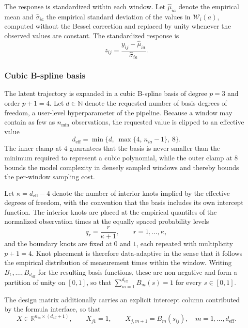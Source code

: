 The response is standardized within each window. Let $\hat{\mu}_{ia}$ denote the empirical mean and $\hat{\sigma}_{ia}$ the empirical standard deviation of the values in $\mathcal{W}_i(a)$, computed without the Bessel correction and replaced by unity whenever the observed values are constant. The standardized response is
$$z_{ij}=\frac{y_{ij}-\hat{\mu}_{ia}}{\hat{\sigma}_{ia}}.$$

\subsubsection{Cubic B-spline basis}
\label{sec:methods:basis}

The latent trajectory is expanded in a cubic B-spline basis of degree $p=3$ and order $p+1=4$. Let $d\in\mathbb{N}$ denote the requested number of basis degrees of freedom, a user-level hyperparameter of the pipeline. Because a window may contain as few as $n_{\min}$ observations, the requested value is clipped to an effective value
$$d_{\mathrm{eff}}=\min\bigl\{d,\ \max\{4,\,n_{ia}-1\},\ 8\bigr\}.$$
The inner clamp at $4$ guarantees that the basis is never smaller than the minimum required to represent a cubic polynomial, while the outer clamp at $8$ bounds the model complexity in densely sampled windows and thereby bounds the per-window sampling cost.

Let $\kappa=d_{\mathrm{eff}}-4$ denote the number of interior knots implied by the effective degrees of freedom, with the convention that the basis includes its own intercept function. The interior knots are placed at the empirical quantiles of the normalized observation times at the equally spaced probability levels
$$q_r=\frac{r}{\kappa+1},\qquad r=1,\dots,\kappa,$$
and the boundary knots are fixed at $0$ and $1$, each repeated with multiplicity $p+1=4$. Knot placement is therefore data-adaptive in the sense that it follows the empirical distribution of measurement times within the window. Writing $B_1,\dots,B_{d_{\mathrm{eff}}}$ for the resulting basis functions, these are non-negative and form a partition of unity on $[0,1]$, so that $\sum_{m=1}^{d_{\mathrm{eff}}}B_m(s)=1$ for every $s\in[0,1]$.

The design matrix additionally carries an explicit intercept column contributed by the formula interface, so that
$$X\in\mathbb{R}^{n_{ia}\times(d_{\mathrm{eff}}+1)},\qquad X_{j1}=1,\qquad X_{j,m+1}=B_m(s_{ij}),\quad m=1,\dots,d_{\mathrm{eff}}.$$

